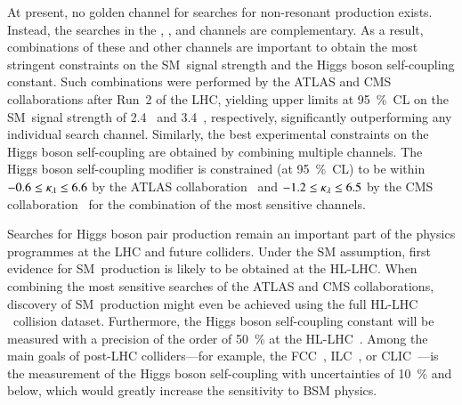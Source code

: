 At present, no golden channel for searches for non-resonant \HH production
exists. Instead, the searches in the \bbbb, \bbtautau, and \bbyy channels are
complementary. As a result, combinations of these and other channels are
important to obtain the most stringent constraints on the SM~\HH signal strength
and the Higgs boson self-coupling constant. Such combinations were performed by
the ATLAS and CMS collaborations after Run~2 of the LHC, yielding upper limits
at \SI{95}{\percent}~CL on the SM~\HH signal strength of 2.4~\cite{HDBS-2022-03}
and 3.4~\cite{CMS-HIG-22-001}, respectively, significantly outperforming any
individual search channel. Similarly, the best experimental constraints on the
Higgs boson self-coupling are obtained by combining multiple channels. The Higgs
boson self-coupling modifier is constrained (at \SI{95}{\percent}~CL) to be
within $-0.6 \leq \kappa_{\lambda} \leq 6.6$ by the ATLAS
collaboration~\cite{HDBS-2022-03} and $-1.2 \leq \kappa_{\lambda} \leq 6.5$ by the CMS
collaboration~\cite{CMS-HIG-22-001} for the combination of the most sensitive
channels.


Searches for Higgs boson pair production remain an important part of the physics
programmes at the LHC and future colliders. Under the SM assumption, first
evidence for SM~\HH production is likely to be obtained at the HL-LHC. When
combining the most sensitive searches of the ATLAS and CMS collaborations,
discovery of SM~\HH production might even be achieved using the full HL-LHC
\pp~collision dataset. Furthermore, the Higgs boson self-coupling constant will
be measured with a precision of the order of \SI{50}{\percent} at the
HL-LHC~\cite{DiMicco:2019ngk}. Among the main goals of post-LHC colliders---for
example, the FCC~\cite{FCC:2018byv}, ILC~\cite{Bambade:2019fyw}, or
CLIC~\cite{CLIC:2018fvx}---is the measurement of the Higgs boson self-coupling
with uncertainties of \SI{10}{\percent} and below, which would greatly increase
the sensitivity to BSM physics.



